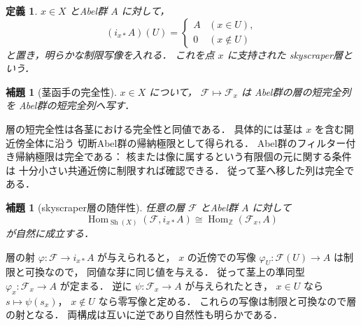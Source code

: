 \documentclass[a5paper,10pt,onecolumn]{jsarticle}
\makeatletter
\theoremstyle{mathnotetheorem}
\newtheorem{definition}[theorem]{定義}
\newtheorem{lemma}[theorem]{補題}
\renewcommand{\proofname}{証明}
\renewenvironment{proof}[1][\proofname]{%
  \par\pushQED{\qed}\normalfont\topsep4\p@\@plus2\p@\relax
  \trivlist\item[\hskip\labelsep\bfseries #1]\ignorespaces
}{\popQED\endtrivlist\@endpefalse}
\makeatother
\begin{document}
\begin{definition}
$x\in X$ とAbel群 $A$ に対して，
\[
 (i_{x*}A)(U)=
 \begin{cases}
 A&(x\in U),\\
 0&(x\notin U)
 \end{cases}
\]
と置き，明らかな制限写像を入れる．
これを点 $x$ に支持された
\emph{skyscraper層}という．
\end{definition}

\begin{lemma}[茎函手の完全性]\label{lem:stalk-exact}
$x\in X$ について，
$\mathcal F\mapsto\mathcal F_x$ は
Abel群の層の短完全列を
Abel群の短完全列へ写す．
\end{lemma}
\begin{proof}
層の短完全性は各茎における完全性と同値である．
具体的には茎は $x$ を含む開近傍全体に沿う
切断Abel群の帰納極限として得られる．
Abel群のフィルター付き帰納極限は完全である：
核または像に属するという有限個の元に関する条件は
十分小さい共通近傍に制限すれば確認できる．
従って茎へ移した列は完全である．
\end{proof}

\begin{lemma}[skyscraper層の随伴性]\label{lem:skyscraper-adj}
任意の層 $\mathcal F$ とAbel群 $A$ に対して
\[
 \operatorname{Hom}_{\operatorname{Sh}(X)}
 (\mathcal F,i_{x*}A)
 \cong\operatorname{Hom}_{\mathbb Z}(\mathcal F_x,A)
\]
が自然に成立する．
\end{lemma}
\begin{proof}
層の射 $\varphi:\mathcal F\to i_{x*}A$ が与えられると，
$x$ の近傍での写像
$\varphi_U:\mathcal F(U)\to A$ は制限と可換なので，
同値な芽に同じ値を与える．
従って茎上の準同型
$\varphi_x:\mathcal F_x\to A$ が定まる．
逆に $\psi:\mathcal F_x\to A$ が与えられたとき，
$x\in U$ なら
$s\mapsto\psi(s_x)$，
$x\notin U$ なら零写像と定める．
これらの写像は制限と可換なので層の射となる．
両構成は互いに逆であり自然性も明らかである．
\end{proof}
\end{document}
